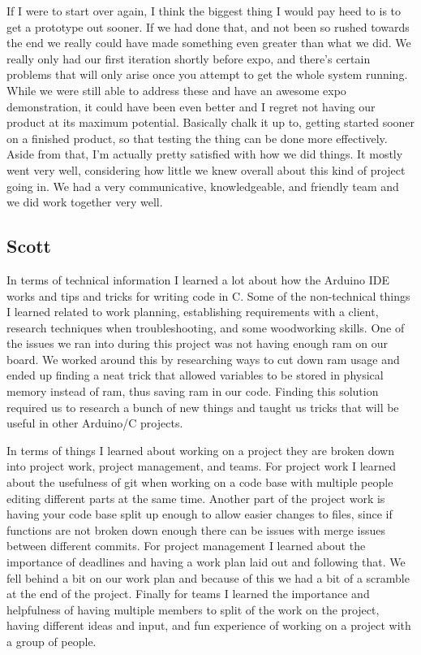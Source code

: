 \documentclass[onecolumn, draftclsnofoot,10pt, compsoc]{IEEEtran}
\begin{document}
If I were to start over again, I think the biggest thing I would pay heed to is to get a prototype out sooner.
If we had done that, and not been so rushed towards the end we really could have made something even greater than what we did.
We really only had our first iteration shortly before expo, and there's certain problems that will only arise once you attempt to get the whole system running.
While we were still able to address these and have an awesome expo demonstration, it could have been even better and I regret not having our product at its maximum potential.
Basically chalk it up to, getting started sooner on a finished product, so that testing the thing can be done more effectively.
Aside from that, I'm actually pretty satisfied with how we did things.
It mostly went very well, considering how little we knew overall about this kind of project going in.
We had a very communicative, knowledgeable, and friendly team and we did work together very well.

\subsection{Scott}
In terms of technical information I learned a lot about how the Arduino IDE works and tips and tricks for writing code in C.
Some of the non-technical things I learned related to work planning, establishing requirements with a client, research techniques when troubleshooting, and some woodworking skills.
One of the issues we ran into during this project was not having enough ram on our board.
We worked around this by researching ways to cut down ram usage and ended up finding a neat trick that allowed variables to be stored in physical memory instead of ram, thus saving ram in our code.
Finding this solution required us to research a bunch of new things and taught us tricks that will be useful in other Arduino/C projects.

In terms of things I learned about working on a project they are broken down into project work, project management, and teams.
For project work I learned about the usefulness of git when working on a code base with multiple people editing different parts at the same time.
Another part of the project work is having your code base split up enough to allow easier changes to files, since if functions are not broken down enough there can be issues with merge issues between different commits.
For project management I learned about the importance of deadlines and having a work plan laid out and following that.
We fell behind a bit on our work plan and because of this we had a bit of a scramble at the end of the project.
Finally for teams I learned the importance and helpfulness of having multiple members to split of the work on the project, having different ideas and input, and fun experience of working on a project with a group of people.
\end{document}
